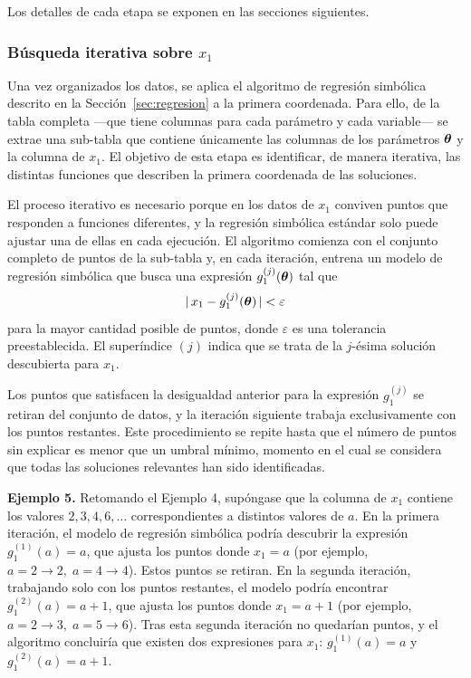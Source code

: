 \documentclass[12pt,a4paper]{article} \usepackage[utf8]{inputenc} \usepackage[spanish]{babel} \usepackage{amsmath, amssymb, amsthm} \usepackage{bm} \usepackage{float} \usepackage{longtable} \usepackage[hidelinks]{hyperref}
\begin{document}
Los detalles de cada etapa se exponen en las secciones siguientes.

\subsubsection{Búsqueda iterativa sobre \(x_1\)}
\label{sec:busqueda_ancla}

Una vez organizados los datos, se aplica el algoritmo de regresión
simbólica descrito en la Sección~\ref{sec:regresion} a la primera
coordenada. Para ello, de la tabla completa —que tiene columnas para
cada parámetro y cada variable— se extrae una sub-tabla que contiene
únicamente las columnas de los parámetros \(\boldsymbol{\theta}\) y la columna
de \(x_1\). El objetivo de esta etapa es identificar, de manera
iterativa, las distintas funciones que describen la primera coordenada
de las soluciones.

El proceso iterativo es necesario porque en los datos de \(x_1\)
conviven puntos que responden a funciones diferentes, y la regresión
simbólica estándar solo puede ajustar una de ellas en cada ejecución.
El algoritmo comienza con el conjunto completo de puntos de la
sub-tabla y, en cada iteración, entrena un modelo de regresión
simbólica que busca una expresión \(g_1^{(j)}(\boldsymbol{\theta})\) tal que
\[
|\,x_1 - g_1^{(j)}(\boldsymbol{\theta})\,| < \varepsilon
\]
para la mayor cantidad posible de puntos, donde \(\varepsilon\) es una
tolerancia preestablecida. El superíndice \((j)\) indica que se trata
de la \(j\)-ésima solución descubierta para \(x_1\).

Los puntos que satisfacen la desigualdad anterior para la expresión
\(g_1^{(j)}\) se retiran del conjunto de datos, y la iteración
siguiente trabaja exclusivamente con los puntos restantes. Este
procedimiento se repite hasta que el número de puntos sin explicar es
menor que un umbral mínimo, momento en el cual se considera que todas
las soluciones relevantes han sido identificadas.

\bigskip
\noindent\textbf{Ejemplo 5.} Retomando el Ejemplo 4, supóngase que la
columna de \(x_1\) contiene los valores \(2, 3, 4, 6, \dots\)
correspondientes a distintos valores de \(a\). En la primera iteración,
el modelo de regresión simbólica podría descubrir la expresión
\(g_1^{(1)}(a) = a\), que ajusta los puntos donde \(x_1 = a\)
(por ejemplo, \(a = 2 \to 2,\; a = 4 \to 4\)). Estos puntos se retiran.
En la segunda iteración, trabajando solo con los puntos restantes, el
modelo podría encontrar \(g_1^{(2)}(a) = a + 1\), que ajusta los puntos
donde \(x_1 = a + 1\) (por ejemplo, \(a = 2 \to 3,\; a = 5 \to 6\)).
Tras esta segunda iteración no quedarían puntos, y el algoritmo
concluiría que existen dos expresiones para \(x_1\): \(g_1^{(1)}(a) = a\)
y \(g_1^{(2)}(a) = a + 1\).
\end{document}

